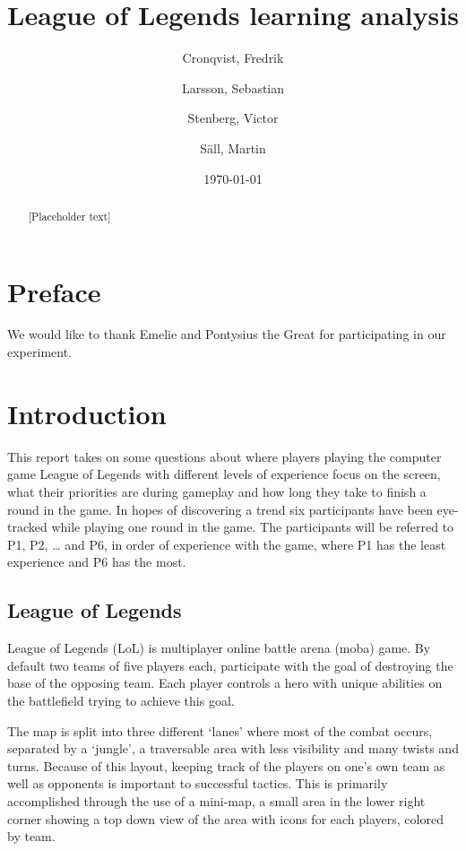 \documentclass[notitlepage]{report}
\author{Cronqvist, Fredrik \and Larsson, Sebastian \and Stenberg, Victor \and S\"{a}ll, Martin}
\date{\today}
\title{League of Legends learning analysis}
\begin{document}
\maketitle

\begin{abstract}
[Placeholder text]
\end{abstract}

\begingroup
\chapter*{Preface}
We would like to thank Emelie and Pontysius the Great for participating in our experiment.

\let\clearpage\relax

\tableofcontents
\endgroup

\chapter{Introduction}
This report takes on some questions about where players playing the computer game League of Legends with different levels of experience focus on the screen, what their priorities are during gameplay and how long they take to finish a round in the game. In hopes of discovering a trend six participants have been eye-tracked while playing one round in the game. The participants will be referred to P1, P2, … and P6, in order of experience with the game, where P1 has the least experience and P6 has the most.

\section{League of Legends}
League of Legends (LoL) is multiplayer online battle arena (moba) game. By default two teams of five players each, participate with the goal of destroying the base of the opposing team. Each player controls a hero with unique abilities on the battlefield trying to achieve this goal.

The map is split into three different `lanes' where most of the combat occurs, separated by a `jungle', a traversable area with less visibility and many twists and turns. Because of this layout, keeping track of the players on one's own team as well as opponents is important to successful tactics. This is primarily accomplished through the use of a mini-map, a small area in the lower right corner showing a top down view of the area with icons for each players, colored by team.
\end{document}
